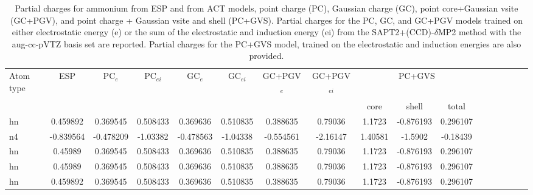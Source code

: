 \begin{sidewaystable}
\caption{Partial charges for ammonium from ESP and from ACT models, point charge (PC), Gaussian charge (GC), point core+Gaussian vsite (GC+PGV), and point charge + Gaussian vsite and shell (PC+GVS).  Partial charges for the PC, GC, and GC+PGV models trained on either electrostatic energy (e) or the sum of the electrostatic and induction energy (ei) from the SAPT2+(CCD)-$\delta$MP2 method with the aug-cc-pVTZ basis set are reported. Partial charges for the PC+GVS model, trained on the electrostatic and induction energies are also provided.}
\hspace{-1cm}
\begin{tabular}{lcccccccccccccccc}
\hline
 Atom type & ESP & PC$_{e}$ & PC$_{ei}$ & GC$_{e}$ & GC$_{ei}$ & GC+PGV$_{e}$ & GC+PGV$_{ei}$ & \multicolumn{3}{c}{PC+GVS} \\\\
 & & & & & & & & core & shell & total \\
\hline
hn & 0.459892 & 0.369545 & 0.508433 & 0.369636 & 0.510835 & 0.388635 & 0.79036 & 1.1723 & -0.876193 & 0.296107 \\
n4 & -0.839564 & -0.478209 & -1.03382 & -0.478563 & -1.04338 & -0.554561 & -2.16147 & 1.40581 & -1.5902 & -0.18439 \\
hn & 0.45989 & 0.369545 & 0.508433 & 0.369636 & 0.510835 & 0.388635 & 0.79036 & 1.1723 & -0.876193 & 0.296107 \\
hn & 0.45989 & 0.369545 & 0.508433 & 0.369636 & 0.510835 & 0.388635 & 0.79036 & 1.1723 & -0.876193 & 0.296107 \\
hn & 0.459892 & 0.369545 & 0.508433 & 0.369636 & 0.510835 & 0.388635 & 0.79036 & 1.1723 & -0.876193 & 0.296107 \\
\hline
\end{tabular}
\end{sidewaystable}
